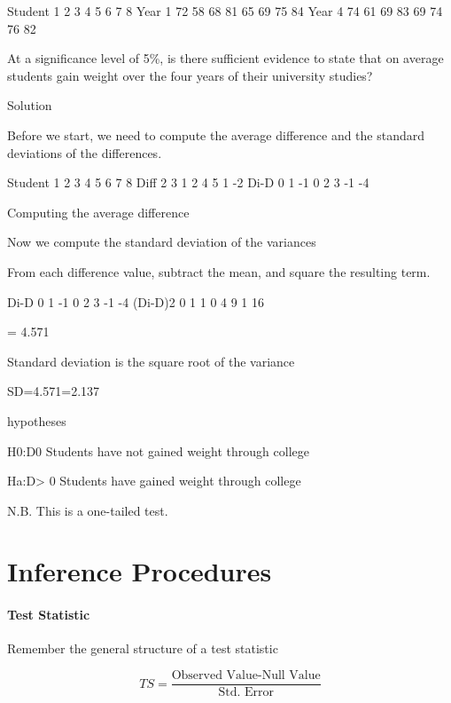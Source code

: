 \documentclass[12pt]{report}
\begin{document}
{Student
1
2
3
4
5
6
7
8
Year 1
72
58
68
81
65
69
75
84
Year 4
74
61
69
83
69
74
76
82

At a significance level of 5\%, is there sufficient evidence to state that on average students gain weight over the four years of their university studies?

Solution

Before we start, we need to compute the average difference and the standard deviations of the differences. 

Student
1
2
3
4
5
6
7
8
Diff
2
3
1
2
4
5
1
-2
Di-D
0
1
-1
0
2
3
-1
-4


Computing the average difference




Now we compute the standard deviation of the variances

From each difference value, subtract the mean, and square the resulting term.


Di-D
0
1
-1
0
2
3
-1
-4
(Di-D)2
0
1
1
0
4
9
1
16





= 4.571

Standard deviation is the square root of the variance

SD=4.571=2.137



hypotheses

H0:D0    Students have not gained weight through college



Ha:D> 0    Students have  gained weight through college


N.B. This is a one-tailed test.

\chapter{Inference Procedures}
\subsubsection{Test Statistic}

Remember the general structure of a test statistic

\begin{framed}
\[TS =  \frac{\mbox{Observed Value-Null Value}}{\mbox{Std. Error}} \]
\end{framed}


}
\end{document}
